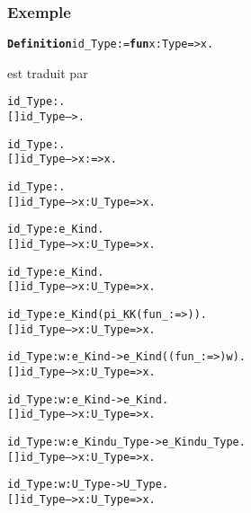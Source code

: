 \documentclass[12pt,aspectratio=169]{beamer}
\begin{document}
\begin{frame}[fragile]
  \frametitle{Exemple}
\begin{alltt}
\color{blue}\textbf{Definition} id_Type := \textbf{fun} x : Type => x.
\end{alltt}

est traduit par
\begin{overprint}
\begin{alltt}
id_Type : \tytrans{\ccprop \rightarrow \ccprop}.  
[] id_Type --> .
\end{alltt}
\begin{alltt}
id_Type : \tytrans{\ccprop \rightarrow \ccprop}.
[] id_Type --> \alert{x : \tytrans{\ccprop} => x}.
\end{alltt}
\begin{alltt}
id_Type : \tytrans{\ccprop \rightarrow \ccprop}.
[] id_Type --> x : \alert{U_Type} => x.
\end{alltt}
\begin{alltt}
id_Type : \alert{e_Kind \tetrans{\ccprop \rightarrow \ccprop}}.
[] id_Type --> x : U_Type => x.
\end{alltt}
\begin{alltt}
id_Type : e_Kind \alert{}.
[] id_Type --> x : U_Type => x.
\end{alltt}
\begin{alltt}
id_Type : e_Kind \alert{(pi_KK \tetrans{\ccprop} (fun _ : \tytrans{\ccprop} => \tetrans{\ccprop}))}.
[] id_Type --> x : U_Type => x.
\end{alltt}
\begin{alltt}
id_Type : \alert{w : e_Kind \tetrans{\ccprop}-> e_Kind((fun _ : \tytrans{\ccprop} => \tetrans{\ccprop}) w)}.
[] id_Type --> x : U_Type => x.
\end{alltt}
\begin{alltt}
id_Type : w : e_Kind \tetrans{\ccprop} -> \alert{e_Kind \tetrans{\ccprop}}.
[] id_Type --> x : U_Type => x.
\end{alltt}
\begin{alltt}
id_Type : \alert{w : e_Kind u_Type -> e_Kind u_Type}.
[] id_Type --> x : U_Type => x.
\end{alltt}
\begin{alltt}
id_Type : \alert{w : U_Type -> U_Type}.
[] id_Type --> x : U_Type => x.
\end{alltt}
\end{overprint}\bigskip


\end{frame}
\end{document}
